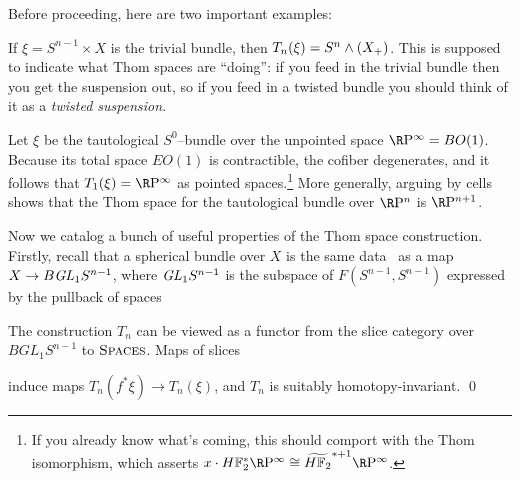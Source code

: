 Before proceeding, here are two important examples:
\begin{example}\label{TrivialBundleThomExample}
If \(\xi = S^{n-1} \times X\) is the trivial bundle, then \(T_n(\xi) = S^n \wedge (X_+)\).  This is supposed to indicate what Thom spaces are ``doing'': if you feed in the trivial bundle then you get the suspension out, so if you feed in a twisted bundle you should think of it as a \textit{twisted suspension}.
\end{example}

\begin{example}\label{RPnThomExample}
Let \(\xi\) be the tautological \(S^0\)--bundle over the unpointed space \(\RP^\infty = BO(1)\).  Because its total space \(EO(1)\) is contractible, the cofiber degenerates, and it follows that \(T_1(\xi) = \RP^\infty\) as pointed spaces.\footnote{If you already know what's coming, this should comport with the Thom isomorphism, which asserts \(x \cdot \HFtwo^* \RP^\infty \cong \widetilde{\HFtwo}^{* + 1} \RP^\infty\).}  More generally, arguing by cells shows that the Thom space for the tautological bundle over \(\RP^n\) is \(\RP^{n+1}\).
\end{example}

Now we catalog a bunch of useful properties of the Thom space construction.  Firstly, recall that a spherical bundle over \(X\) is the same data~\cite{MayClassifyingSpaces} as a map \(X \to B \mathit{GL}_1 S^{n-1}\), where \(\mathit{GL}_1 S^{n-1}\) is the subspace of \(F(S^{n-1}, S^{n-1})\) expressed by the pullback of spaces
\begin{center}
\end{center}

\begin{lemma}\label{ThomConstructionIsASliceFunctor}
The construction \(T_n\) can be viewed as a functor from the slice category over \(BGL_1 S^{n-1}\) to \(\normalfont\textsc{Spaces}\).  Maps of slices
\begin{center}
\end{center}
induce maps \(T_n(f^* \xi) \to T_n(\xi)\), and \(T_n\) is suitably homotopy-invariant. \qed
\end{lemma}

